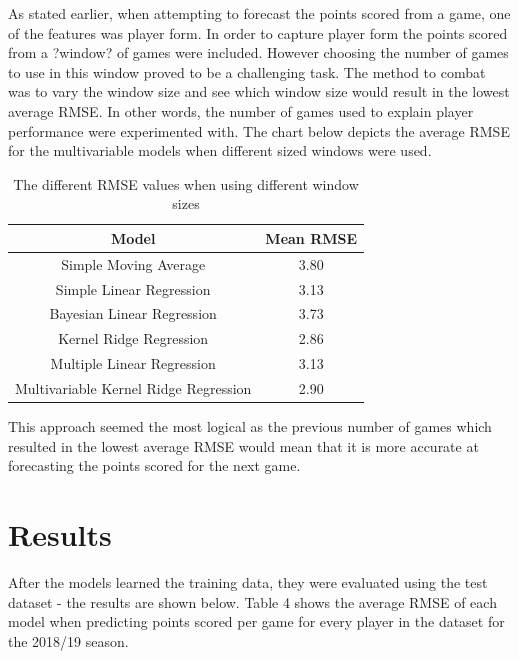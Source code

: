 \documentclass[a4paper,11pt,twoside]{article}
\begin{document}
As stated earlier, when attempting to forecast the points scored from a game, one of the features was player form. In order to capture player form the points scored from a ?window? of games were included. However choosing the number of games to use in this window proved to be a challenging task. The method to combat was to vary the window size and see which window size would result in the lowest average RMSE. In other words, the number of games used to explain player performance were experimented with. The chart below depicts the average RMSE for the multivariable models when different sized windows were used. 

\vspace{5mm}
\begin{table}[h!]
\captionsetup{justification=centering}
\begin{center}
\begin{tabular}{ |c|c|} 
 \hline
     \textbf{Model} & \textbf{Mean RMSE}\\ 
 \hline
 Simple Moving Average  & 3.80\\ 
 \hline
 Simple Linear Regression & 3.13\\ 
 \hline
 Bayesian Linear Regression  & 3.73 \\
 \hline
 Kernel Ridge Regression  & 2.86\\
 \hline
 Multiple Linear Regression& 3.13\\
 \hline
 Multivariable Kernel Ridge Regression  & 2.90\\
 \hline
\end{tabular}
\end{center}
\caption{The different RMSE values when using different window sizes}
\end{table}
\vspace{5mm}

This approach seemed the most logical as the previous number of games which resulted in the lowest average RMSE would mean that it is more accurate at forecasting the points scored for the next game.

\newpage

\section{Results}

After the models learned the training data, they were evaluated using the test dataset - the results are shown below. Table 4 shows the average RMSE of each model when predicting points scored per game for every player in the dataset for the 2018/19 season.
\end{document}
